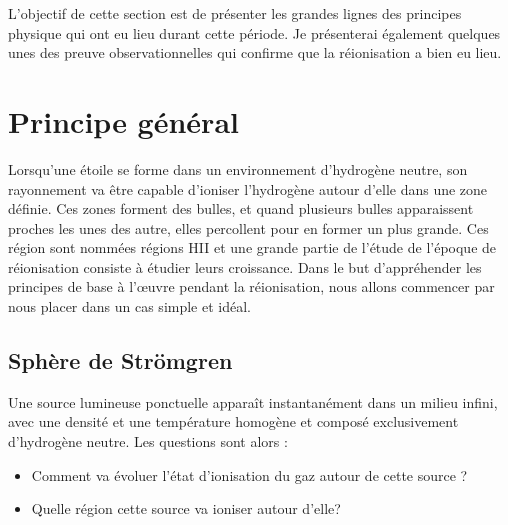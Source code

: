 


L'objectif de cette section est de présenter les grandes lignes des principes physique qui ont eu lieu durant cette période.
Je présenterai également quelques unes des preuve observationnelles qui confirme que la réionisation a bien eu lieu.


\section{Principe général}

Lorsqu'une étoile se forme dans un environnement d'hydrogène neutre, son rayonnement va être capable d'ioniser l'hydrogène autour d'elle dans une zone définie.
Ces zones forment des bulles, et quand plusieurs bulles apparaissent proches les unes des autre, elles percollent pour en former un plus grande.
Ces région sont nommées régions HII et une grande partie de l'étude de l'époque de réionisation consiste à étudier leurs croissance.
Dans le but d’appréhender les principes de base à l’œuvre pendant la réionisation, nous allons commencer par nous placer dans un cas simple et idéal.

\subsection{Sphère de Strömgren}
\label{sec:stromgren}

Une source lumineuse ponctuelle apparaît instantanément dans un milieu infini, avec une densité et une température homogène et composé exclusivement d’hydrogène neutre.
Les questions sont alors : 
\begin{itemize}
\item Comment va évoluer l’état d'ionisation du gaz autour de cette source ?
\item Quelle région cette source va ioniser autour d'elle?
\end{itemize}

